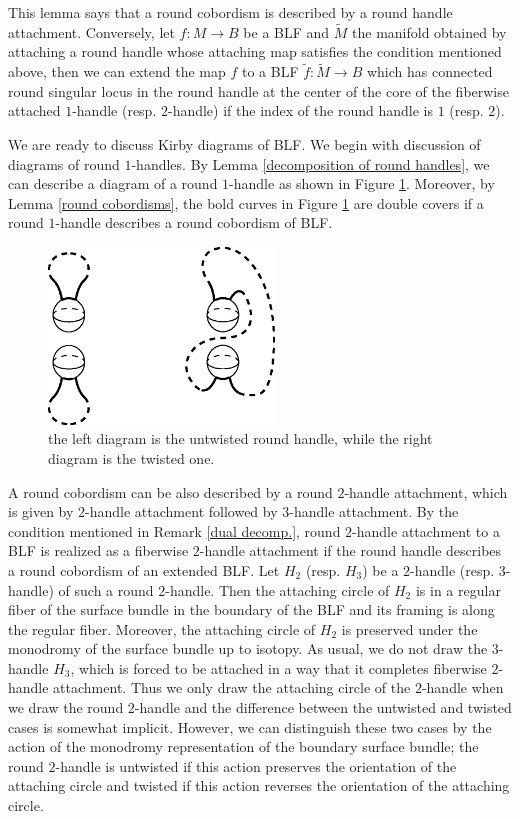 \documentclass{amsart}
\theoremstyle{plain}
\theoremstyle{definition}
\begin{document}
This lemma says that a round cobordism is described by a round handle attachment. 
Conversely, let $f:M\rightarrow B$ be a BLF and $\tilde{M}$ the manifold obtained by attaching a round handle whose attaching map satisfies the condition mentioned above, 
then we can extend the map $f$ to a BLF $\tilde{f}:\tilde{M}\rightarrow B$ 
which has connected round singular locus in the round handle at the center of the core of the fiberwise attached $1$-handle (resp. $2$-handle) if the index of the round handle is $1$ (resp. $2$). 
\par
We are ready to discuss Kirby diagrams of BLF. 
We begin with discussion of diagrams of round $1$-handles. 
By Lemma \ref{decomposition of round handles}, we can describe a diagram of a round $1$-handle as shown in Figure \ref{round1handle}. 
Moreover, by Lemma \ref{round cobordisms}, the bold curves in Figure \ref{round1handle} are double covers if a round $1$-handle describes a round cobordism of BLF. 

\begin{figure}[htbp]
\begin{center}
\includegraphics[width=60mm]{round1handle.eps}
\end{center}
\caption{the left diagram is the untwisted round handle, while the right diagram is the twisted one.}
\label{round1handle}
\end{figure}

A round cobordism can be also described by a round $2$-handle attachment, which is given by $2$-handle attachment followed by $3$-handle attachment. 
By the condition mentioned in Remark \ref{dual decomp.}, 
round $2$-handle attachment to a BLF is realized as a fiberwise $2$-handle attachment 
if the round handle describes a round cobordism of an extended BLF. 
Let $H_2$ (resp. $H_3$) be a $2$-handle (resp. $3$-handle) of such a round $2$-handle. 
Then the attaching circle of $H_2$ is in a regular fiber of the surface bundle in the boundary of the BLF 
and its framing is along the regular fiber. 
Moreover, the attaching circle of $H_2$ is preserved under the monodromy of the surface bundle up to isotopy. 
As usual, we do not draw the $3$-handle $H_3$, which is forced to be attached in a way that it completes fiberwise $2$-handle attachment. 
Thus we only draw the attaching circle of the $2$-handle when we draw the round $2$-handle and the difference between the untwisted and twisted cases is somewhat implicit. 
However, we can distinguish these two cases by the action of the monodromy representation of the boundary surface bundle; 
the round $2$-handle is untwisted if this action preserves the orientation of the attaching circle and twisted if this action reverses the orientation of the attaching circle. 
\end{document}
